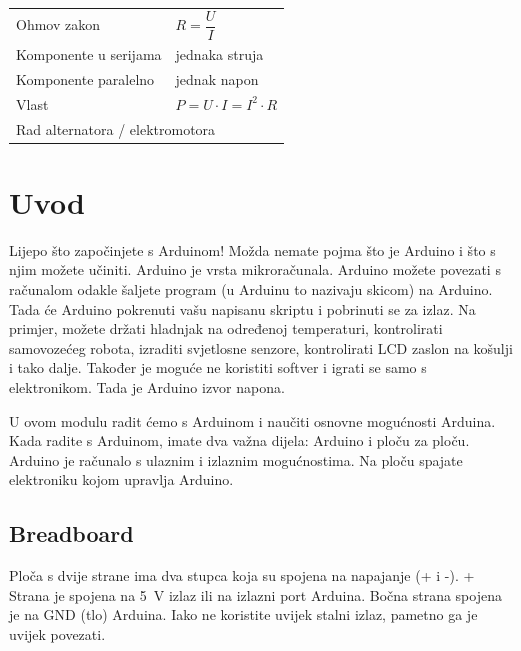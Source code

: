 \documentclass{arduino}
\begin{document}
\begin{tabular}{@{}ll@{}}
Ohmov zakon                                                 &  $R = \dfrac{U}{I}$            \\
Komponente u serijama                                      &  jednaka struja                 \\
Komponente paralelno                                   &  jednak napon                 \\
Vlast                                                     &  $P = U \cdot I = I^2 \cdot R$ \\
\multicolumn{2}{l}{Rad alternatora / elektromotora} \\
\end{tabular}

\newpage

\section{Uvod}

Lijepo što započinjete s Arduinom! Možda nemate pojma što je Arduino i što s njim možete učiniti. Arduino je vrsta mikroračunala. Arduino možete povezati s računalom odakle šaljete program (u Arduinu to nazivaju skicom) na Arduino. Tada će Arduino pokrenuti vašu napisanu skriptu i pobrinuti se za izlaz. Na primjer, možete držati hladnjak na određenoj temperaturi, kontrolirati samovozećeg robota, izraditi svjetlosne senzore, kontrolirati LCD zaslon na košulji i tako dalje. Također je moguće ne koristiti softver i igrati se samo s elektronikom. Tada je Arduino izvor napona.

U ovom modulu radit ćemo s Arduinom i naučiti osnovne mogućnosti Arduina. Kada radite s Arduinom, imate dva važna dijela: Arduino i ploču za ploču. Arduino je računalo s ulaznim i izlaznim mogućnostima. Na ploču spajate elektroniku kojom upravlja Arduino.

\subsection{Breadboard}

Ploča s dvije strane ima dva stupca koja su spojena na napajanje (+ i -). + Strana je spojena na \SI{5}{\volt} izlaz ili na izlazni port Arduina. Bočna strana spojena je na GND (tlo) Arduina. Iako ne koristite uvijek stalni izlaz, pametno ga je uvijek povezati.
\end{document}
